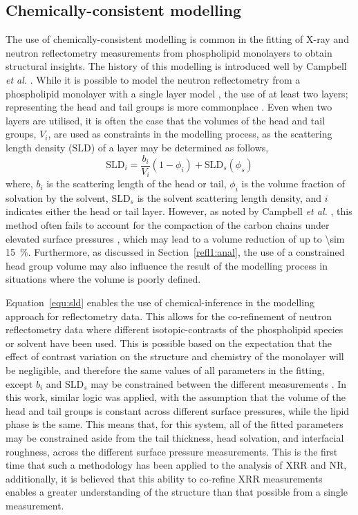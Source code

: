 \subsection{Chemically-consistent modelling}
The use of chemically-consistent modelling is common in the fitting of X-ray and neutron reflectometry measurements from phospholipid monolayers to obtain structural insights.
The history of this modelling is introduced well by Campbell \emph{et al.} \cite{campbell_structure_2018}.
While it is possible to model the neutron reflectometry from a phospholipid monolayer with a single layer model \cite{wojciechowski_interaction_2016,wojciechowski_complexation_2016}, the use of at least two layers; representing the head and tail groups is more commonplace \cite{foglia_interaction_2014,bello_influence_2016}.
Even when two layers are utilised, it is often the case that the volumes of the head and tail groups, $V_i$, are used as constraints in the modelling process, as the scattering length density ($\text{SLD}$) of a layer may be determined as follows,
%
\begin{equation}
\text{SLD}_i = \frac{b_i}{V_i}(1-\phi_i)+\text{SLD}_s(\phi_s)
\label{equ:sld}
\end{equation}
%
where, $b_i$ is the scattering length of the head or tail, $\phi_i$ is the volume fraction of solvation by the solvent, $\text{SLD}_s$ is the solvent scattering length density, and $i$ indicates either the head or tail layer.
However, as noted by Campbell \emph{et al.} \cite{campbell_structure_2018}, this method often fails to account for the compaction of the carbon chains under elevated surface pressures \cite{mcconlogue_close_1997,small_lateral_1984}, which may lead to a volume reduction of up to \SI{\sim 15}{\percent}.
Furthermore, as discussed in Section~\ref{refl1:anal}, the use of a constrained head group volume may also influence the result of the modelling process in situations where the volume is poorly defined.

Equation~\ref{equ:sld} enables the use of chemical-inference in the modelling approach for reflectometry data.
This allows for the co-refinement of neutron reflectometry data where different isotopic-contrasts of the phospholipid species or solvent have been used.
This is possible based on the expectation that the effect of contrast variation on the structure and chemistry of the monolayer will be negligible, and therefore the same values of all parameters in the fitting, except $b_i$ and $\text{SLD}_s$ may be constrained between the different measurements \cite{hollinshead_effects_2009}.
In this work, similar logic was applied, with the assumption that the volume of the head and tail groups is constant across different surface pressures, while the lipid phase is the same.
This means that, for this system, all of the fitted parameters may be constrained aside from the tail thickness, head solvation, and interfacial roughness, across the different surface pressure measurements.
This is the first time that such a methodology has been applied to the analysis of XRR and NR, additionally, it is believed that this ability to co-refine XRR measurements enables a greater understanding of the structure than that possible from a single measurement.
